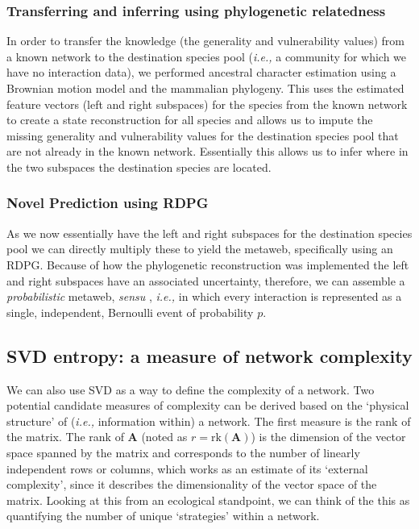 \begin{refsection}
\subsubsection{Transferring and inferring using phylogenetic relatedness}

In order to transfer the knowledge (the generality and vulnerability values) from a known network to the destination species pool (\emph{i.e.,} a community for which we have no interaction data), we performed ancestral character estimation using a Brownian motion model and the \cite{Upham2019Inferring} mammalian phylogeny. This uses the estimated feature vectors (left and right subspaces) for the species from the known network to create a state reconstruction for all species and allows us to impute the missing generality and vulnerability values for the destination species pool that are not already in the known network. Essentially this allows us to infer where in the two subspaces the destination species are located.

\subsubsection{Novel Prediction using RDPG}

As we now essentially have the left and right subspaces for the destination species pool we can directly multiply these to yield the metaweb, specifically using an RDPG. Because of how the phylogenetic reconstruction was implemented the left and right subspaces have an associated uncertainty, therefore, we can assemble a \emph{probabilistic} metaweb, \emph{sensu} \cite{Poisot2016Structure}, \emph{i.e.,} in which every interaction is represented as a single, independent, Bernoulli event of probability \(p\).

\subsection{SVD entropy: a measure of network
complexity}\label{svd-entropy-a-measure-of-network-complexity}

We can also use SVD as a way to define the complexity of a network. Two potential candidate measures of complexity can be derived based on the `physical structure' of (\emph{i.e.,} information within) a network. The first measure is the rank of the matrix. The rank of $\mathbf{A}$ (noted as $r = \text{rk}(\mathbf{A})$) is the dimension of the vector space spanned by the matrix and corresponds to the number of linearly independent rows or columns, which works as an estimate of its `external complexity', since it describes the dimensionality of the vector space of the matrix. Looking at this from an ecological standpoint, we can think of the this as quantifying the number of unique `strategies' within a network.


\end{refsection}
